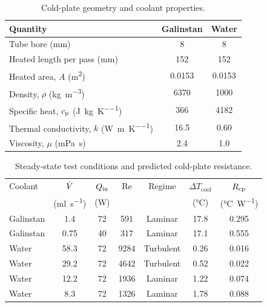 \begin{table}[htbp]
  \centering
  \caption{Cold-plate geometry and coolant properties.}
  \label{tab:coolant-properties}
  \small
  \begin{tabular}{@{}lcc@{}}
    \toprule
    Quantity & Galinstan & Water \\
    \midrule
    Tube bore (\si{\milli\metre})                        & 8    & 8    \\
    Heated length per pass (\si{\milli\metre})           & 152  & 152  \\
    Heated area, $A$ (\si{\metre\squared})               & 0.0153 & 0.0153 \\
    Density, $\rho$ (\si{\kilogram\per\metre\cubed})      & 6370 & 1000 \\
    Specific heat, $c_{\mathrm{p}}$ (\si{\joule\per\kilogram\per\kelvin}) & 366 & 4182 \\
    Thermal conductivity, $k$ (\si{\watt\per\metre\per\kelvin}) & 16.5 & 0.60 \\
    Viscosity, $\mu$ (\si{\milli\pascal\second})         & 2.4  & 1.0  \\
    \bottomrule
  \end{tabular}
\end{table}

\begin{table}[htbp]
  \centering
  \caption{Steady-state test conditions and predicted cold-plate resistance.}
  \label{tab:tests}
  \small
  \begin{tabular}{@{}lcccccc@{}}
    \toprule
    Coolant & $\dot{V}$ & $Q_{\mathrm{in}}$ & Re & Regime & $\Delta T_\mathrm{cool}$ & $R_{\mathrm{cp}}$ \\
            & (\si{\milli\litre\per\second}) & (\si{\watt}) & & & (\si{\celsius})
            & (\si{\celsius\per\watt}) \\
    \midrule
    Galinstan & 1.4  & 72 & 591  & Laminar   & 17.8\tnote{a} & 0.295 \\
    Galinstan & 0.75 & 40 & 317  & Laminar   & 17.1\tnote{a} & 0.555 \\
    Water     & 58.3 & 72 & 9284 & Turbulent & 0.26 & 0.016\tnote{b} \\
    Water     & 29.2 & 72 & 4642 & Turbulent & 0.52 & 0.022\tnote{b} \\
    Water     & 12.2 & 72 & 1936 & Laminar   & 1.22 & 0.074 \\
    Water     & 8.3  & 72 & 1326 & Laminar   & 1.78 & 0.088 \\
    \bottomrule
  \end{tabular}
\end{table}

